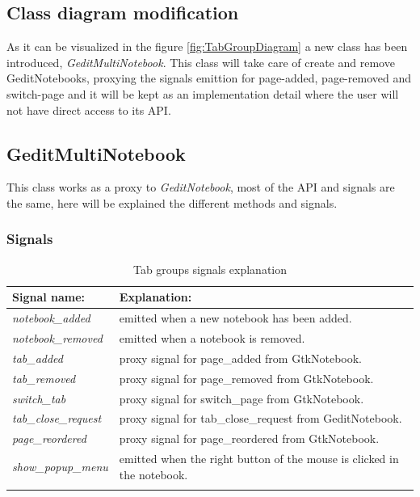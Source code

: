 \newpage
\subsection{Class diagram modification}


As it can be visualized in the figure \ref{fig:TabGroupDiagram} a new class has been introduced, \emph{GeditMultiNotebook}. This class will take care of create and remove GeditNotebooks, proxying the signals emittion for page-added, page-removed and switch-page and it will be kept as an implementation detail where the user will not have direct access to its API.

\newpage
\subsection{GeditMultiNotebook}

This class works as a proxy to \emph{GeditNotebook}, most of the API and signals are the same, here will be explained the different methods and signals.

\subsubsection{Signals}

\begin{table}[H]
  \begin{center}
    \begin{tabularx}{\textwidth}{|l|X|}
      \firsthline
      \textbf{Signal name:} & \textbf{Explanation:} \\
      \hline
      \textit{notebook\_added} & emitted when a new notebook has been added. \\
      \hline
      \textit{notebook\_removed} & emitted when a notebook is removed. \\
      \hline
      \textit{tab\_added} & proxy signal for page\_added from GtkNotebook. \\
      \hline
      \textit{tab\_removed} & proxy signal for page\_removed from GtkNotebook. \\
      \hline
      \textit{switch\_tab} & proxy signal for switch\_page from GtkNotebook. \\
      \hline
      \textit{tab\_close\_request} & proxy signal for tab\_close\_request from GeditNotebook. \\
      \hline
      \textit{page\_reordered} & proxy signal for page\_reordered from GtkNotebook. \\
      \hline
      \textit{show\_popup\_menu} & emitted when the right button of the mouse is clicked in the notebook. \\
      \lasthline
    \end{tabularx}
    \caption{Tab groups signals explanation}
  \end{center}
\end{table}

